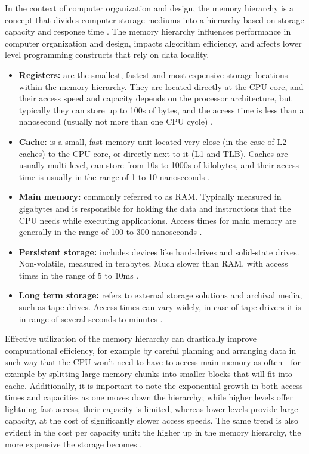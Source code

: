 \noindent In the context of computer organization and design, the memory hierarchy is a concept that divides computer storage mediums into a hierarchy based on storage capacity and response time
\cite{oldbooksmarthead}. The memory hierarchy influences performance in computer organization and design,
impacts algorithm efficiency, and affects lower level programming constructs that rely on data locality.

\begin{itemize}
	\item \textbf{Registers:} are the smallest, fastest and most expensive storage locations within the memory hierarchy. They are located directly at the CPU core, and their access speed and capacity depends on the processor
		architecture, but typically they can store up to 100s of bytes, and the access time is less than a nanosecond (usually not more than one CPU cycle) \cite{whatevery}.
	\item \textbf{Cache:} is a small, fast memory unit located very close (in the case of L2 caches) to the CPU core, or directly next to it (L1 and TLB). Caches are usually multi-level,
		can store from 10s to 1000s of kilobytes, and their access time is usually in the range of 1 to 10 nanoseconds \cite{whatevery, Patterson2013}.
	\item \textbf{Main memory:} commonly referred to as RAM. Typically measured in gigabytes and is responsible for holding the data and instructions that the CPU needs while executing
		applications. Access times for main memory are generally in the range of 100 to 300 nanoseconds \cite{whatevery, Hamacher2011}.
	\item \textbf{Persistent storage:} includes devices like hard-drives and solid-state drives. Non-volatile, measured in terabytes. Much slower than RAM, with access times in the range of 5 to 10ms \cite{hddssdspeeds}.
	\item \textbf{Long term storage:} refers to external storage solutions and archival media, such as tape drives. Access times can vary widely, in case of tape drivers it is in range of several
		seconds to minutes \cite{tapetimesspeed}.
\end{itemize}

\noindent Effective utilization of the memory hierarchy can drastically improve computational efficiency, for example by careful planning and arranging data in such way that the
CPU won't need to have to access main memory as often - for example by splitting large memory chunks into smaller blocks that will fit into cache.
Additionally, it is important to note the exponential growth in both access times and capacities as one moves down the hierarchy; while higher levels offer lightning-fast access,
their capacity is limited, whereas lower levels provide large capacity, at the cost of significantly slower access speeds. The same trend is also evident in the cost per capacity unit: the higher
up in the memory hierarchy, the more expensive the storage becomes \cite{comparchaquant}.

